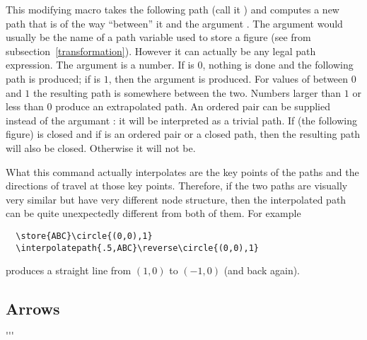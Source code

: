 \documentclass[letterpaper]{article}
\begin{document}
This modifying macro takes the following path (call it ) and
computes a new path that is  of the way ``between'' it and
the argument . The argument  would usually be
the name of a \MF{} path variable used to store a figure (see 
from subsection~\ref{transformation}). However it can actually be any
legal \MF{} path expression. The argument  is a number. If
 is $0$, nothing is done and the following path 
is produced; if  is $1$, then the argument  is
produced. For values of  between $0$ and $1$ the resulting
path is somewhere between the two. Numbers larger than $1$ or less than
$0$ produce an extrapolated path. An ordered pair can be supplied
instead of the argumant : it will be interpreted as a
trivial path. If  (the following figure) is closed and if
 is an ordered pair or a closed path, then the resulting
path will also be closed. Otherwise it will not be.

What this command actually interpolates are the key points of the paths
and the directions of travel at those key points. Therefore, if the two
paths are visually very similar but have very different node structure,
then the interpolated path can be quite unexpectedly different from both
of them. For example
\begin{verbatim}
  \store{ABC}\circle{(0,0),1}
  \interpolatepath{.5,ABC}\reverse\circle{(0,0),1}
\end{verbatim}
produces a straight line from $(1,0)$ to $(-1,0)$ (and back again).



\subsection{Arrows}\label{arrows}

\begin{cd}
%
    $\ldots$\\
%
    $\ldots$%
\end{cd}
\end{document}
